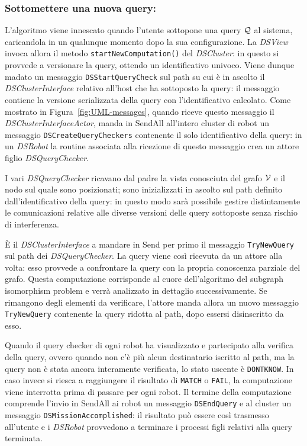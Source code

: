 \subsubsection*{Sottomettere una nuova query:}
L'algoritmo viene innescato quando l'utente sottopone una query $\mathcal{Q}$
al sistema, caricandola in un qualunque momento
dopo la sua configurazione. La \emph{DSView} invoca allora
il metodo \texttt{startNewComputation()} del \emph{DSCluster}:
in questo si provvede a versionare la query,
ottendo un identificativo univoco.
Viene dunque madato un messaggio
\texttt{DSStartQueryCheck} sul path su cui è in ascolto
il \emph{DSClusterInterface} relativo all'host che ha sottoposto
la query: il messaggio contiene la versione serializzata
della query con l'identificativo calcolato.
Come mostrato in Figura~\ref{fig:UML-messages},
quando riceve questo messaggio il \emph{DSClusterInterfaceActor},
manda in SendAll all'intero cluster di robot un messaggio
\texttt{DSCreateQueryCheckers} contenente il solo identificativo della
query: in un \emph{DSRobot} la routine associata alla ricezione
di questo messaggio crea un attore figlio \emph{DSQueryChecker}.

I vari \emph{DSQueryChecker} ricavano dal padre la vista
conosciuta del grafo $\mathcal{V}$ e il nodo sul quale sono posizionati;
sono inizializzati in ascolto sul path definito dall'identificativo
della query: in questo modo sarà possibile gestire
distintamente le comunicazioni relative alle diverse versioni delle
query sottoposte senza rischio di interferenza.

\`E il \emph{DSClusterInterface} a mandare in Send per primo
il messaggio \texttt{TryNewQuery} sul path dei \emph{DSQueryChecker}.
La query viene così ricevuta da un attore alla volta: esso provvede
a confrontare la query con la propria conoscenza parziale del grafo.
Questa computazione corrisponde al cuore dell'algoritmo del
subgraph isomorphism problem e verrà analizzato in dettaglio
successivamente.
Se rimangono degli elementi da verificare, l'attore manda allora
un nuovo messaggio \texttt{TryNewQuery} contenente la query ridotta
al path, dopo essersi disinscritto da esso.

Quando il query checker di ogni robot ha visualizzato e partecipato
alla verifica della query, ovvero quando non c'è più alcun destinatario
iscritto al path, ma la query non è stata ancora interamente verificata,
lo stato uscente è \texttt{DONTKNOW}.
In caso invece si riesca a raggiungere il risultato di \texttt{MATCH}
o \texttt{FAIL}, la computazione viene interrotta prima di passare
per ogni robot. Il termine della computazione comprende l'invio
in SendAll ai robot un messaggio \texttt{DSEndQuery} e al cluster
un messaggio \texttt{DSMissionAccomplished}:
il risultato può essere così trasmesso all'utente e i \emph{DSRobot}
provvedono a terminare i processi figli relativi alla query terminata.

